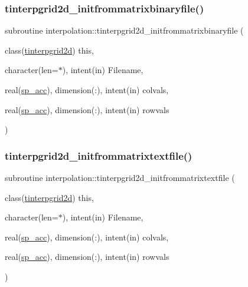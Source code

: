 \subsubsection{\texorpdfstring{tinterpgrid2d\+\_\+initfrommatrixbinaryfile()}{tinterpgrid2d\_initfrommatrixbinaryfile()}}
{\footnotesize\ttfamily subroutine interpolation\+::tinterpgrid2d\+\_\+initfrommatrixbinaryfile (\begin{DoxyParamCaption}\item[{class(\mbox{\hyperlink{structinterpolation_1_1tinterpgrid2d}{tinterpgrid2d}})}]{this,  }\item[{character(len=$\ast$), intent(in)}]{Filename,  }\item[{real(\mbox{\hyperlink{namespaceinterpolation_af72aa9a05feb8ef90b2d26e4a013abf3}{sp\+\_\+acc}}), dimension(\+:), intent(in)}]{colvals,  }\item[{real(\mbox{\hyperlink{namespaceinterpolation_af72aa9a05feb8ef90b2d26e4a013abf3}{sp\+\_\+acc}}), dimension(\+:), intent(in)}]{rowvals }\end{DoxyParamCaption})}

\mbox{\label{namespaceinterpolation_aba9a8e8e9bf241c6a561b243f3e92620}} 
\subsubsection{\texorpdfstring{tinterpgrid2d\+\_\+initfrommatrixtextfile()}{tinterpgrid2d\_initfrommatrixtextfile()}}
{\footnotesize\ttfamily subroutine interpolation\+::tinterpgrid2d\+\_\+initfrommatrixtextfile (\begin{DoxyParamCaption}\item[{class(\mbox{\hyperlink{structinterpolation_1_1tinterpgrid2d}{tinterpgrid2d}})}]{this,  }\item[{character(len=$\ast$), intent(in)}]{Filename,  }\item[{real(\mbox{\hyperlink{namespaceinterpolation_af72aa9a05feb8ef90b2d26e4a013abf3}{sp\+\_\+acc}}), dimension(\+:), intent(in)}]{colvals,  }\item[{real(\mbox{\hyperlink{namespaceinterpolation_af72aa9a05feb8ef90b2d26e4a013abf3}{sp\+\_\+acc}}), dimension(\+:), intent(in)}]{rowvals }\end{DoxyParamCaption})}



